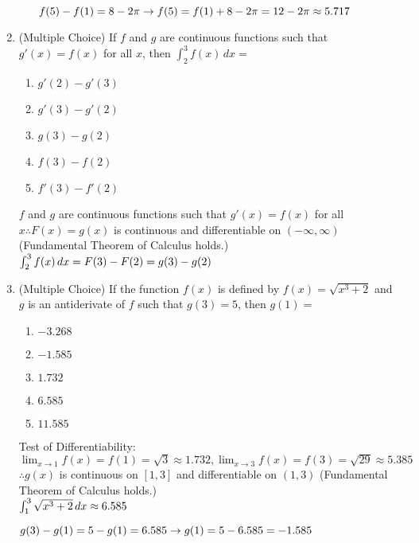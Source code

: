 \documentclass[10pt, letterpaper]{report}
\begin{document}
\begin{enumerate}
\begin{enumerate}
        $f(5)-f(1)=8-2\pi\rightarrow
        f(5)=f(1)+8-2\pi=12-2\pi\approx5.717\\$

		\end{enumerate}
\pagebreak
	\item{(Multiple Choice) If $f$ and $g$ are continuous functions such that $g'(x)=f(x)$ for all $x$, then $\int_{2}^{3}{f(x)}\,dx=$\\}
		\begin{enumerate}
			\item{$g'(2)-g'(3)$}
			\item{$g'(3)-g'(2)$}
			\item{$g(3)-g(2)$}
			\item{$f(3)-f(2)$}
			\item{$f'(3)-f'(2)$\\}
		\end{enumerate}

    $f$ and $g$ are continuous functions such that $g'(x)=f(x)$ for all $x\therefore F(x)=g(x)$ is continuous and differentiable on $(-\infty, \infty)$ (Fundamental Theorem of Calculus holds.) \\

    $\int_{2}^{3}{f(x)}\,dx=
    F(3)-F(2)=g(3)-g(2)\\$
	\item{(Multiple Choice) If the function $f(x)$ is defined by $f(x)=\sqrt{x^{3}+2}$ and $g$ is an antiderivate of $f$ such that $g(3)=5$, then $g(1)=$\\}
		\begin{enumerate}
			\item{$-3.268$}
			\item{$-1.585$}
			\item{$1.732$}
			\item{$6.585$}
			\item{$11.585$\\}
		\end{enumerate}

    Test of Differentiability:
    $\lim_{x\to 1}f(x)=f(1)=\sqrt{3}\approx1.732,
    \lim_{x\to 3}f(x)=f(3)=\sqrt{29}\approx5.385$\\
    $\therefore g(x)$ is continuous on $[1,3]$ and differentiable on $(1,3)$ (Fundamental Theorem of Calculus holds.) \\

    $\int_{1}^{3}{\sqrt{x^{3}+2}}\,dx\approx6.585\\$

    $g(3)-g(1)=5-g(1)=6.585\rightarrow
    g(1)=5-6.585=-1.585\\$


\end{enumerate}
\end{document}

